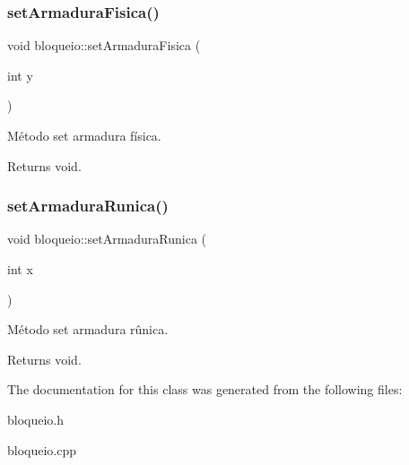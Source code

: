\subsubsection{\texorpdfstring{set\+Armadura\+Fisica()}{setArmaduraFisica()}}
{\footnotesize\ttfamily void bloqueio\+::set\+Armadura\+Fisica (\begin{DoxyParamCaption}\item[{int}]{y }\end{DoxyParamCaption})}



Método set armadura física. 

\begin{DoxyReturn}{Returns}
void. 
\end{DoxyReturn}
\mbox{\label{classbloqueio_a93d5e345503601ea3c06367e5ab0797b}} 
\subsubsection{\texorpdfstring{set\+Armadura\+Runica()}{setArmaduraRunica()}}
{\footnotesize\ttfamily void bloqueio\+::set\+Armadura\+Runica (\begin{DoxyParamCaption}\item[{int}]{x }\end{DoxyParamCaption})}



Método set armadura rûnica. 

\begin{DoxyReturn}{Returns}
void. 
\end{DoxyReturn}


The documentation for this class was generated from the following files\+:\begin{DoxyCompactItemize}
\item 
bloqueio.\+h\item 
bloqueio.\+cpp\end{DoxyCompactItemize}
